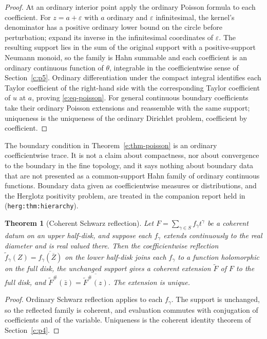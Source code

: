 \documentclass[11pt,a4paper]{article}
\numberwithin{equation}{section}
\newtheorem{theorem}{Theorem}[section]
\theoremstyle{definition}
\theoremstyle{remark}
\theoremstyle{plain}
\newcommand{\tm}{t}
\newcommand{\ev}[1]{#1^{\#}}
\begin{document}
\begin{proof}
At an ordinary interior point apply the ordinary Poisson formula to each
coefficient.  For $z=a+\varepsilon$ with $a$ ordinary and $\varepsilon$
infinitesimal, the kernel's denominator has a positive ordinary lower
bound on the circle before perturbation; expand its inverse in the
infinitesimal coordinates of $\varepsilon$.  The resulting support lies in
the sum of the original support with a positive-support Neumann monoid, so
the family is Hahn summable and each coefficient is an ordinary continuous
function of $\theta$, integrable in the coefficientwise sense of Section~\ref{c:p5}.
Ordinary differentiation under the compact integral identifies each Taylor
coefficient of the right-hand side with the corresponding Taylor
coefficient of $u$ at $a$, proving \eqref{e:eq-poisson}.  For general
continuous boundary coefficients take their ordinary Poisson extensions
and reassemble with the same support; uniqueness is the uniqueness of the
ordinary Dirichlet problem, coefficient by coefficient.
\end{proof}

The boundary condition in Theorem~\ref{e:thm-poisson} is an ordinary
coefficientwise trace.  It is not a claim about compactness, nor about
convergence to the boundary in the fine topology, and it says nothing
about boundary data that are not presented as a common-support Hahn family
of ordinary continuous functions.
Boundary data given as coefficientwise measures or distributions, and the
Herglotz positivity problem, are treated in the companion report held in
(\texttt{herg:thm:hierarchy}).

\begin{theorem}[Coherent Schwarz reflection]\label{e:thm-reflection}
Let $F=\sum_{\gamma\in S}f_\gamma\tm^\gamma$ be a coherent datum on an
upper half-disk, and suppose each $f_\gamma$ extends continuously to the
real diameter and is real valued there.  Then the coefficientwise
reflection $\widetilde f_\gamma(Z)=\overline{f_\gamma(\overline Z)}$ on
the lower half-disk joins each $f_\gamma$ to a function holomorphic on the
full disk, the unchanged support gives a coherent extension
$\widetilde F$ of $F$ to the full disk, and
$\ev{\widetilde F}(\bar z)=\overline{\ev{\widetilde F}(z)}$.  The
extension is unique.
\end{theorem}

\begin{proof}
Ordinary Schwarz reflection applies to each $f_\gamma$.  The support is
unchanged, so the reflected family is coherent, and evaluation commutes
with conjugation of coefficients and of the variable.  Uniqueness is the
coherent identity theorem of Section~\ref{c:p4}.
\end{proof}
\end{document}
